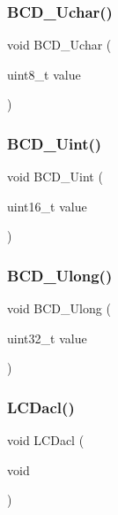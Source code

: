 \mbox{\label{lcd_8h_a6f9c47cbcd978ebbb1e443d94ceda26e}} 
\subsubsection{B\+C\+D\+\_\+\+Uchar()}
{\footnotesize\ttfamily void B\+C\+D\+\_\+\+Uchar (\begin{DoxyParamCaption}\item[{uint8\+\_\+t}]{value }\end{DoxyParamCaption})}

\mbox{\label{lcd_8h_a83b2b2a5de3a2efff61432f60b1aaffc}} 
\subsubsection{B\+C\+D\+\_\+\+Uint()}
{\footnotesize\ttfamily void B\+C\+D\+\_\+\+Uint (\begin{DoxyParamCaption}\item[{uint16\+\_\+t}]{value }\end{DoxyParamCaption})}

\mbox{\label{lcd_8h_a2a94ac620ddde4753e24822d6841a851}} 
\subsubsection{B\+C\+D\+\_\+\+Ulong()}
{\footnotesize\ttfamily void B\+C\+D\+\_\+\+Ulong (\begin{DoxyParamCaption}\item[{uint32\+\_\+t}]{value }\end{DoxyParamCaption})}

\mbox{\label{lcd_8h_ab6928d673710c2a0c303f7bfc9bd4063}} 
\subsubsection{L\+C\+Dacl()}
{\footnotesize\ttfamily void L\+C\+Dacl (\begin{DoxyParamCaption}\item[{void}]{ }\end{DoxyParamCaption})}

